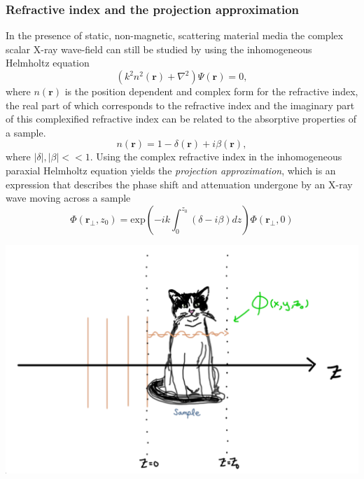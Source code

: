 \documentclass[10pt, a4paper, singlespacing]{report}
\newenvironment{Figure}
    {\par\medskip\noindent\minipage{\linewidth}}
    {\endminipage\par\medskip}
\begin{document}
\subsubsection{Refractive index and the projection approximation}\label{PA}
In the presence of static, non-magnetic, scattering material media the complex scalar X-ray wave-field can still be studied by using the inhomogeneous Helmholtz equation 
\begin{equation}\label{eq:10}
\left ( k^2 n^2 (\mathbf{r}) + \nabla^{2}  \right )\Psi(\mathbf{r}) = 0,
\end{equation}
where $n(\mathbf{r})$ is the position dependent and complex form for the refractive index, the real part of which corresponds to the refractive index and the imaginary part of this complexified refractive index can be related to the absorptive properties of a sample\cite{PagsTutes}.
\begin{equation}\label{eq:11}
n(\mathbf{r}) = 1 - \delta(\mathbf{r}) + i \beta(\mathbf{r}),
\end{equation}
where $|\delta|, |\beta| << 1$. Using the complex refractive index in the inhomogeneous paraxial Helmholtz equation yields the \textit{projection approximation}, which is an expression that describes the phase shift and attenuation undergone by an X-ray wave moving across a sample
\begin{equation}\label{eq:12}
\Phi(\mathbf{r}_{\perp}, z_0) = \mathrm{exp} \left ( -ik \int_{0}^{z_0}(\delta - i\beta)dz\right ) \Phi(\mathbf{r}_{\perp}, 0)
\end{equation}
\begin{Figure}
\centering
\includegraphics[width=0.6\linewidth]{projection_approximation.pdf}\label{fig:2}
\end{Figure}
\end{document}
